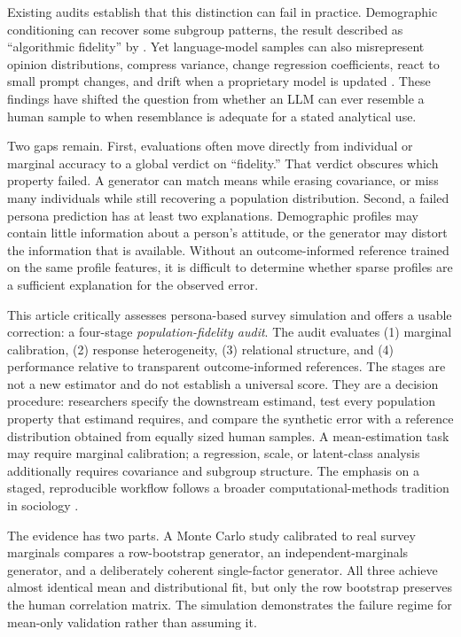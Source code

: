 \documentclass[10pt,twocolumn]{article}
\begin{document}
Existing audits establish that this distinction can fail in practice. Demographic conditioning can
recover some subgroup patterns, the result described as ``algorithmic fidelity'' by
\textcite{argyle2023one}. Yet language-model samples can also misrepresent opinion distributions,
compress variance, change regression coefficients, react to small prompt changes, and drift when a
proprietary model is updated \parencite{santurkar2023opinions,bisbee2024synthetic,qu2024performance}.
These findings have shifted the question from whether an LLM can ever resemble a human sample to
when resemblance is adequate for a stated analytical use.

Two gaps remain. First, evaluations often move directly from individual or marginal accuracy to a
global verdict on ``fidelity.'' That verdict obscures which property failed. A generator can match
means while erasing covariance, or miss many individuals while still recovering a population
distribution. Second, a failed persona prediction has at least two explanations. Demographic
profiles may contain little information about a person's attitude, or the generator may distort the
information that is available. Without an outcome-informed reference trained on the same profile
features, it is difficult to determine whether sparse profiles are a sufficient explanation for
the observed error.

This article critically assesses persona-based survey simulation and offers a usable correction: a
four-stage \emph{population-fidelity audit}. The audit evaluates (1) marginal calibration,
(2) response heterogeneity, (3) relational structure, and (4) performance relative to transparent
outcome-informed references. The stages are not a new estimator and do not establish a universal
score. They are a decision procedure: researchers specify the downstream estimand, test every
population property that estimand requires, and compare the synthetic error with a reference
distribution obtained from equally sized human samples. A mean-estimation task may require marginal
calibration; a regression, scale, or latent-class analysis additionally requires covariance and
subgroup structure. The emphasis on a staged,
reproducible workflow follows a broader computational-methods tradition in sociology
\parencite{nelson2020computational}.

The evidence has two parts. A Monte Carlo study calibrated to real survey marginals compares a
row-bootstrap generator, an independent-marginals generator, and a deliberately coherent
single-factor generator. All three achieve almost identical mean and distributional fit, but only
the row bootstrap preserves the human correlation matrix. The simulation demonstrates the failure
regime for mean-only validation rather than assuming it.
\end{document}

